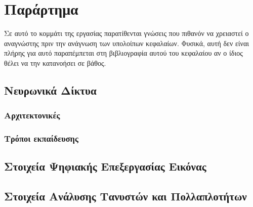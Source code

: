 \chapter{Παράρτημα}

Σε αυτό το κομμάτι της εργασίας παρατίθενται γνώσεις που πιθανόν να χρειαστεί ο αναγνώστης πριν την ανάγνωση των υπολοίπων κεφαλαίων. Φυσικά, αυτή δεν είναι πλήρης για αυτό παραπέμπεται στη βιβλιογραφία αυτού του κεφαλαίου αν ο ίδιος θέλει να την κατανοήσει σε βάθος.


\section{Νευρωνικά Δίκτυα}


\subsection{Αρχιτεκτονικές}

\subsection{Τρόποι εκπαίδευσης}


\section{Στοιχεία Ψηφιακής Επεξεργασίας Εικόνας}


\section{Στοιχεία Ανάλυσης Τανυστών και Πολλαπλοτήτων}

